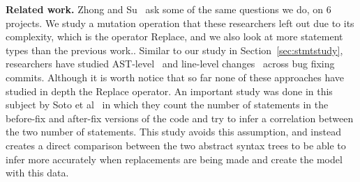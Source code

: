 
\vspace{1ex} \noindent\textbf{Related work.} Zhong and Su~\cite{zhong2015} ask
some of the same questions we do, on 6 projects. We study a mutation operation that these researchers left out due to its complexity, which is the operator Replace, and we also look at more statement types than the previous work.. Similar to our study in
Section~\ref{sec:stmtstudy}, researchers have 
studied AST-level~\cite{Martinez:2015ez} and line-level
changes~\cite{Asaduzzaman:2013df} across bug fixing commits.
Although it is worth notice that so far none of these approaches have studied in depth the Replace operator.
An important study was done in this subject by Soto et al~\cite{soto} in which they count the number of statements in the before-fix and after-fix versions of the code and try to infer a correlation between the two number of statements. This study avoids this assumption, and instead creates a direct comparison between the two abstract syntax trees to be able to infer more accurately when replacements are being made and create the model with this data.

